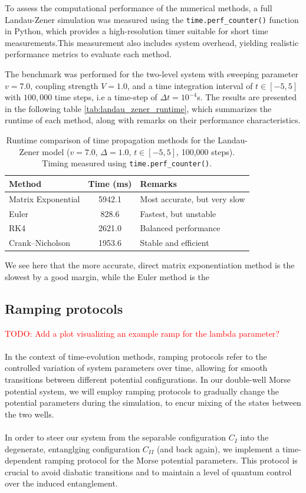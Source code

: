 \documentclass{subfiles}
\begin{document}
To assess the computational performance of the numerical methods, a full Landau-Zener simulation was measured using the \texttt{time.perf\_counter()} function in Python, which provides a high-resolution timer suitable for short time measurements.This measurement also includes system overhead, yielding realistic performance metrics to evaluate each method. 

The benchmark was performed for the two-level system with sweeping parameter $v=7.0$, coupling strength $V=1.0$, and a time integration interval of $t \in [-5, 5]$ with $100{,}000$ time steps, i.e a time-step of $\Delta t = 10^{-4}$s. The results are presented in the following table \eqref{tab:landau_zener_runtime}, which summarizes the runtime of each method, along with remarks on their performance characteristics.

\begin{table}[h!]
\centering
\caption{Runtime comparison of time propagation methods for the Landau-Zener model ($v = 7.0$, $\Delta = 1.0$, $t \in [-5, 5]$, 100,000 steps). Timing measured using \texttt{time.perf\_counter()}.}
\begin{tabular}{l c l}
\toprule
\textbf{Method} & \textbf{Time (ms)} & \textbf{Remarks} \\
\midrule
Matrix Exponential & 5942.1 & Most accurate, but very slow \\
Euler              & 828.6  & Fastest, but unstable \\
RK4                & 2621.0 & Balanced performance \\
Crank--Nicholson   & 1953.6 & Stable and efficient \\
\bottomrule
\end{tabular}\label{tab:landau_zener_runtime}
\end{table}
We see here that the more accurate, direct matrix exponentiation method is the slowest by a good margin, while the Euler method is the

\subsection{Ramping protocols}
\textcolor{red}{TODO: Add a plot visualizing an example ramp for the lambda parameter?} \\\\
In the context of time-evolution methods, ramping protocols refer to the controlled variation of system parameters over time, allowing for smooth transitions between different potential configurations. In our double-well Morse potential system, we will employ ramping protocols to gradually change the potential parameters during the simulation, to encur mixing of the states between the two wells. \\\\
In order to steer our system from the separable configuration $C_I$ into the degenerate, entanglging configuration $C_{II}$ (and back again), we implement a time-dependent ramping protocol for the Morse potential parameters. This protocol is crucial to avoid diabatic transitions and to maintain a level of quantum control over the induced entanglement.
\end{document}
